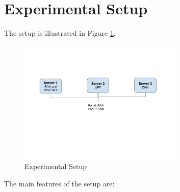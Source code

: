 \section {Experimental Setup}
The setup is illustrated in Figure \ref{figExperimentalSetup}.
\begin{figure}[htbp]
    \centering
    \includegraphics[width=0.7\textwidth, keepaspectratio]{./fig/Results/Setup.png}
    \caption{Experimental Setup}
    \label{figExperimentalSetup}
\end{figure}
 The main features of the setup are: 
